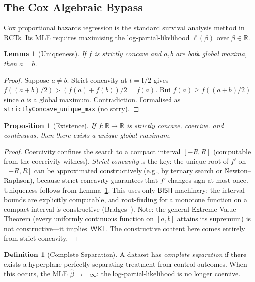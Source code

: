 \documentclass[11pt,a4paper]{article}
\theoremstyle{plain}
\newtheorem{proposition}[theorem]{Proposition}
\newtheorem{lemma}[theorem]{Lemma}
\theoremstyle{definition}
\newtheorem{definition}[theorem]{Definition}
\newcommand{\BISH}{\textsf{BISH}}
\newcommand{\WKL}{\textsf{WKL}}
\newcommand{\R}{\mathbb{R}}
\begin{document}
\subsection{The Cox Algebraic Bypass}

Cox proportional hazards regression is the standard survival analysis method in RCTs.  Its MLE requires maximising the log-partial-likelihood $\ell(\beta)$ over $\beta \in \R$.

\begin{lemma}[Uniqueness]\label{lem:unique}
If $f$ is strictly concave and $a, b$ are both global maxima, then $a = b$.
\end{lemma}

\begin{proof}
Suppose $a \neq b$.  Strict concavity at $t = 1/2$ gives $f((a+b)/2) > (f(a) + f(b))/2 = f(a)$.  But $f(a) \geq f((a+b)/2)$ since $a$ is a global maximum.  Contradiction.  Formalised as \texttt{strictlyConcave\_unique\_max} (no sorry).
\end{proof}

\begin{proposition}[Existence]\label{prop:existence}
If $f : \R \to \R$ is strictly concave, coercive, and continuous, then there exists a unique global maximum.
\end{proposition}

\begin{proof}
Coercivity confines the search to a compact interval $[-R, R]$ (computable from the coercivity witness).  \emph{Strict concavity} is the key: the unique root of $f'$ on $[-R, R]$ can be approximated constructively (e.g., by ternary search or Newton--Raphson), because strict concavity guarantees that $f'$ changes sign at most once.  Uniqueness follows from Lemma~\ref{lem:unique}.  This uses only $\BISH$ machinery: the interval bounds are explicitly computable, and root-finding for a monotone function on a compact interval is constructive (Bridges~\cite{bridges-richman}).  Note: the general Extreme Value Theorem (every uniformly continuous function on $[a,b]$ attains its supremum) is not constructive---it implies~$\WKL$.  The constructive content here comes entirely from strict concavity.
\end{proof}

\begin{definition}[Complete Separation]
A dataset has \emph{complete separation} if there exists a hyperplane perfectly separating treatment from control outcomes.  When this occurs, the MLE $\hat\beta \to \pm\infty$: the log-partial-likelihood is no longer coercive.
\end{definition}
\end{document}
